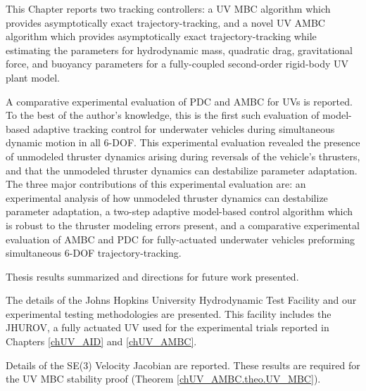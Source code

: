 This Chapter reports two tracking controllers: a \ac{UV} \ac{MBC}
algorithm which provides asymptotically exact trajectory-tracking, and
a novel \ac{UV} \ac{AMBC} algorithm which provides asymptotically
exact trajectory-tracking while estimating the parameters for
hydrodynamic mass, quadratic drag, gravitational force, and buoyancy
parameters for a fully-coupled second-order rigid-body \ac{UV} plant
model.

A comparative experimental evaluation of \ac{PDC} and
\ac{AMBC} for \acp{UV} is reported.
%
To the best of the author's knowledge, this is the first such
evaluation of model-based adaptive tracking control for underwater
vehicles during simultaneous dynamic motion in all 6-\ac{DOF}.
%
This experimental evaluation revealed the presence of unmodeled
thruster dynamics arising during reversals of the vehicle's thrusters,
and that the unmodeled thruster dynamics
can destabilize parameter adaptation.
%
The three major contributions of this experimental evaluation are: an
experimental analysis of how unmodeled thruster dynamics can
destabilize parameter adaptation, a two-step adaptive model-based
control algorithm which is robust to the thruster modeling errors
present, and a comparative experimental evaluation of \ac{AMBC} and
\ac{PDC} for fully-actuated underwater vehicles
preforming simultaneous 6-\ac{DOF} trajectory-tracking.



Thesis results summarized and directions for future work presented.



The details of the Johns Hopkins University Hydrodynamic Test Facility
and our experimental testing methodologies are presented.
%
This facility includes the \ac{JHUROV}, a fully actuated \ac{UV} used
for the experimental trials reported in Chapters \ref{chUV_AID} and
\ref{chUV_AMBC}.



Details of the SE(3) Velocity Jacobian are reported.  These results
are required for the \ac{UV} \ac{MBC} stability proof (Theorem
\ref{chUV_AMBC.theo.UV_MBC}).
%



